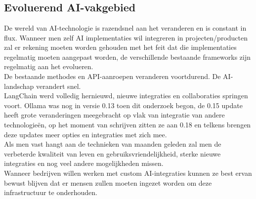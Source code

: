 \chapter{}%
\label{ch:risicosvanaigebruik}

\section{Evoluerend AI-vakgebied}
\label{sec:evoluerendaivakgebied}
De wereld van AI-technologie is razendsnel aan het veranderen en is constant in flux. Wanneer men zelf AI implementaties wil integreren in projecten/producten zal er rekening moeten worden gehouden met het feit dat die implementaties regelmatig moeten aangepast worden, de verschillende bestaande frameworks zijn regelmatig aan het evolueren. \\

De bestaande methodes en API-aanroepen veranderen voortdurend. De AI-landschap verandert snel. \\ %

LangChain werd volledig hernieuwd, nieuwe integraties en collaboraties springen voort. Ollama was nog in versie 0.13 toen dit onderzoek begon, de 0.15 update heeft grote veranderingen meegebracht op vlak van integratie van andere technologieën, op het moment van schrijven zitten ze aan 0.18 en telkens brengen deze updates meer opties en integraties met zich mee. \\

Als men vast hangt aan de technieken van maanden geleden zal men de verbeterde kwaliteit van leven en gebruiksvriendelijkheid, sterke nieuwe integraties en nog veel andere mogelijkheden missen. \\

Wanneer bedrijven willen werken met custom AI-integraties kunnen ze best ervan bewust blijven dat er mensen zullen moeten ingezet worden om deze infrastructuur te onderhouden. 


